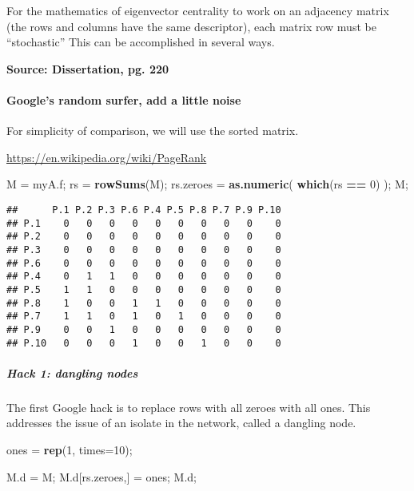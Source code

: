 \documentclass[
]{article}
\newenvironment{Shaded}{\begin{snugshade}}{\end{snugshade}}
\newcommand{\DataTypeTok}[1]{\textcolor[rgb]{0.13,0.29,0.53}{#1}}
\newcommand{\DecValTok}[1]{\textcolor[rgb]{0.00,0.00,0.81}{#1}}
\newcommand{\KeywordTok}[1]{\textcolor[rgb]{0.13,0.29,0.53}{\textbf{#1}}}
\newcommand{\NormalTok}[1]{#1}
\newcommand{\OperatorTok}[1]{\textcolor[rgb]{0.81,0.36,0.00}{\textbf{#1}}}
\newcommand{\StringTok}[1]{\textcolor[rgb]{0.31,0.60,0.02}{#1}}
\begin{document}
For the mathematics of eigenvector centrality to work on an adjacency
matrix (the rows and columns have the same descriptor), each matrix row
must be ``stochastic'' This can be accomplished in several ways.

\textbf{Source: Dissertation, pg. 220}

\hypertarget{googles-random-surfer-add-a-little-noise}{%
\paragraph{Google's random surfer, add a little
noise}\label{googles-random-surfer-add-a-little-noise}}

For simplicity of comparison, we will use the sorted matrix.

\url{https://en.wikipedia.org/wiki/PageRank}

\begin{Shaded}
\begin{Highlighting}[]
\NormalTok{M =}\StringTok{ }\NormalTok{myA.f;}
\NormalTok{rs =}\StringTok{ }\KeywordTok{rowSums}\NormalTok{(M);}
\NormalTok{rs.zeroes =}\StringTok{ }\KeywordTok{as.numeric}\NormalTok{( }\KeywordTok{which}\NormalTok{(rs }\OperatorTok{==}\StringTok{ }\DecValTok{0}\NormalTok{) );}
\NormalTok{M;}
\end{Highlighting}
\end{Shaded}

\begin{verbatim}
##      P.1 P.2 P.3 P.6 P.4 P.5 P.8 P.7 P.9 P.10
## P.1    0   0   0   0   0   0   0   0   0    0
## P.2    0   0   0   0   0   0   0   0   0    0
## P.3    0   0   0   0   0   0   0   0   0    0
## P.6    0   0   0   0   0   0   0   0   0    0
## P.4    0   1   1   0   0   0   0   0   0    0
## P.5    1   1   0   0   0   0   0   0   0    0
## P.8    1   0   0   1   1   0   0   0   0    0
## P.7    1   1   0   1   0   1   0   0   0    0
## P.9    0   0   1   0   0   0   0   0   0    0
## P.10   0   0   0   1   0   0   1   0   0    0
\end{verbatim}

\hypertarget{hack-1-dangling-nodes}{%
\subparagraph{Hack 1: dangling nodes}\label{hack-1-dangling-nodes}}

The first Google hack is to replace rows with all zeroes with all ones.
This addresses the issue of an isolate in the network, called a dangling
node.

\begin{Shaded}
\begin{Highlighting}[]
\NormalTok{ones =}\StringTok{ }\KeywordTok{rep}\NormalTok{(}\DecValTok{1}\NormalTok{, }\DataTypeTok{times=}\DecValTok{10}\NormalTok{);}

\NormalTok{M.d =}\StringTok{ }\NormalTok{M;}
\NormalTok{M.d[rs.zeroes,] =}\StringTok{ }\NormalTok{ones;}
\NormalTok{M.d;}
\end{Highlighting}
\end{Shaded}
\end{document}

